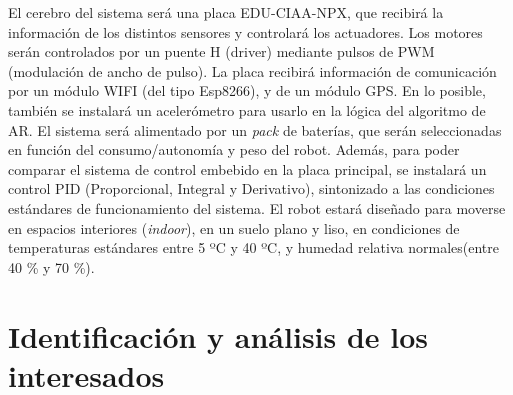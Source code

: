 \documentclass[11pt]{charter}
\begin{document}
\vspace{25px}

El cerebro del sistema será una placa EDU-CIAA-NPX, que recibirá la información de los distintos sensores y controlará los actuadores. Los motores serán controlados por un puente H (driver) mediante pulsos de PWM (modulación de ancho de pulso). La placa recibirá información de comunicación por un módulo WIFI (del tipo Esp8266), y de un módulo GPS. En lo posible, también se instalará un acelerómetro para usarlo en la lógica del algoritmo de AR.
El sistema será alimentado por un \textit{pack} de baterías, que serán seleccionadas en función del consumo/autonomía y peso del robot.
Además, para poder comparar el sistema de control embebido en la placa principal, se instalará un control PID (Proporcional, Integral y Derivativo), sintonizado a las condiciones estándares de funcionamiento del sistema.
El robot estará diseñado para moverse en espacios interiores (\textit{indoor}), en un suelo plano y liso, en condiciones de temperaturas estándares entre 5 ºC y 40 ºC, y humedad relativa normales(entre 40 \% y 70 \%). 




\section{Identificación y análisis de los interesados}
\label{sec:interesados}

 
 
\end{document}

